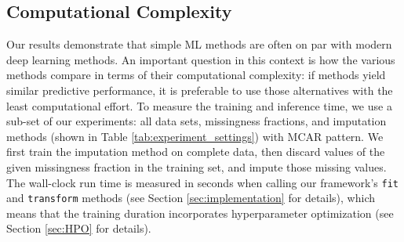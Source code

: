 \documentclass[utf8]{frontiersSCNS} %
\newcommand{\code}[1]{\texttt{#1}}
\begin{document}
\subsection{Computational Complexity}
%
Our results demonstrate that simple ML methods are often on par with modern deep learning methods. An important question in this context is how the various methods compare in terms of their computational complexity: if methods yield similar predictive performance, it is preferable to use those alternatives with the least computational effort. To measure the training and inference time, we use a sub-set of our experiments: all data sets, missingness fractions, and imputation methods (shown in Table \ref{tab:experiment_settings}) with MCAR pattern. We first train the imputation method on complete data, then discard values of the given missingness fraction in the training set, and impute those missing values. The wall-clock run time is measured in seconds when calling our framework's \code{fit} and \code{transform} methods (see Section \ref{sec:implementation} for details), which means that the training duration incorporates hyperparameter optimization (see Section \ref{sec:HPO} for details).
\end{document}
